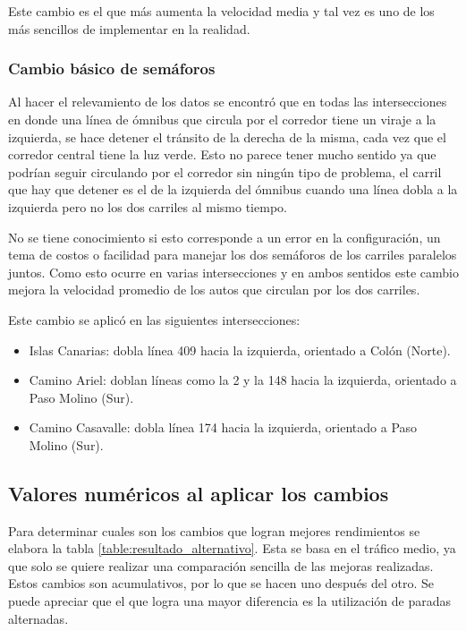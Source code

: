 Este cambio es el que más aumenta la velocidad media y tal vez es uno de los más sencillos de implementar en la realidad.



\subsubsection{Cambio básico de semáforos}
Al hacer el relevamiento de los datos se encontró que en todas las intersecciones en donde una línea de ómnibus que circula por el corredor tiene un viraje a la izquierda, se hace detener el tránsito de la derecha de la misma, cada vez que el corredor central tiene la luz verde. Esto no parece tener mucho sentido ya que podrían seguir circulando por el corredor sin ningún tipo de problema, el carril que hay que detener es el de la izquierda del ómnibus cuando una línea dobla a la izquierda pero no los dos carriles al mismo tiempo.

No se tiene conocimiento si esto corresponde a un error en la configuración, un tema de costos o facilidad para manejar los dos semáforos de los carriles paralelos juntos. Como esto ocurre en varias intersecciones y en ambos sentidos este cambio mejora la velocidad promedio de los autos que circulan por los dos carriles.

Este cambio se aplicó en las siguientes intersecciones:
\begin{itemize}
	\item Islas Canarias: dobla línea 409 hacia la izquierda, orientado a Colón (Norte).
	\item Camino Ariel: doblan líneas como la  2 y la 148 hacia la izquierda, orientado a Paso Molino (Sur). 
	\item Camino Casavalle: dobla línea 174 hacia la izquierda, orientado a Paso Molino (Sur). 
\end{itemize}

\subsection{Valores numéricos al aplicar los cambios}

Para determinar cuales son los cambios que logran mejores rendimientos se elabora la tabla \ref{table:resultado_alternativo}. Esta se basa en el tráfico medio, ya que solo se quiere realizar una comparación sencilla de las mejoras realizadas. Estos cambios son acumulativos, por lo que se hacen uno después del otro. Se puede apreciar que el que logra una mayor diferencia es la utilización de paradas alternadas.


